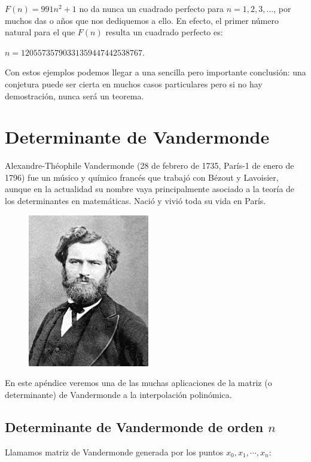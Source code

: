  	    \begin{ejem}
 			$F(n)=991n^2+1$ no da nunca un cuadrado perfecto para $n=1,2,3,...$, por muchos das o años que nos dediquemos a ello. En efecto, el primer número natural para el que $F(n)$ resulta un cuadrado perfecto es:
 			
 			$n=12055735790331359447442538767.$
 		\end{ejem}
 		
 		 Con estos ejemplos podemos llegar a una sencilla pero importante conclusión: una conjetura puede ser cierta en muchos casos particulares pero si no hay demostración, nunca será un teorema.
 		 
 		 
 \chapter{Determinante de Vandermonde}
 \label{Vandermonde}
 
 \begin{multicols}{2}
Alexandre-Théophile Vandermonde (28 de febrero de 1735, París-1 de enero de 1796) fue un músico y químico francés que trabajó con Bézout y Lavoisier, aunque en la actualidad su nombre vaya principalmente asociado a la teoría de los determinantes en matemáticas. Nació y vivió toda su vida en París.

\begin{figure}[H]
	\centering
	\includegraphics[width=.3\textwidth]{imagenes/apendices/APENDICESIM02.png}
\end{figure}
\end{multicols}

En este apéndice veremos una de las muchas aplicaciones de la matriz (o determinante) de Vandermonde a la interpolación polinómica.

\section{Determinante de Vandermonde de orden $n$}

\noindent Llamamos matriz de Vandermonde generada por los puntos \small{$x_0, x_1, \cdots, x_n$}\normalsize{:}

